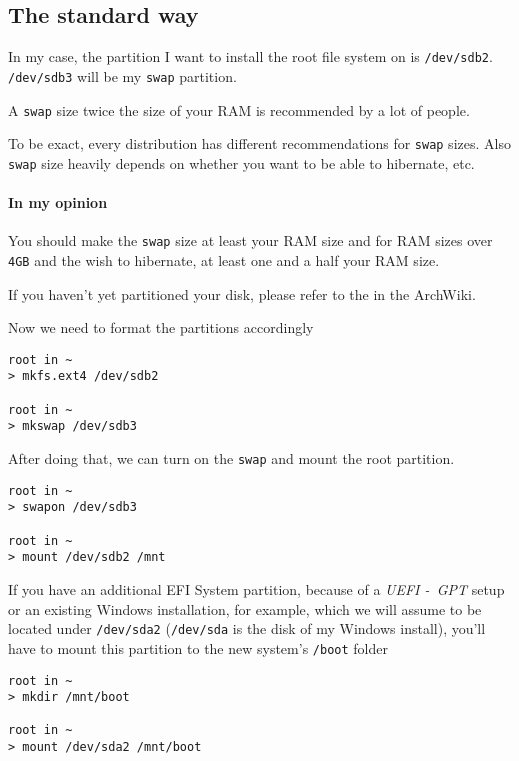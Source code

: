 \documentclass[10pt]{dustdoc}
\begin{document}
\subsection{The standard way}%
\label{sec:the-standard-way}

In my case, the partition I want to install the root file system on is \texttt{/dev/sdb2}.
\texttt{/dev/sdb3} will be my \texttt{swap} partition.

\begin{NOTE}
    A \texttt{swap} size twice the size of your RAM is recommended by a lot of people.

    To be exact, every distribution has different recommendations for \texttt{swap} sizes.
    Also \texttt{swap} size heavily depends on whether you want to be able to hibernate, etc.

    \paragraph{In my opinion}
    You should make the \texttt{swap} size at least your RAM size and for RAM sizes over \texttt{4GB} and the wish to hibernate, at least one and a half your RAM size.
\end{NOTE}

\begin{IMPORTANT}
    If you haven’t yet partitioned your disk, please refer to the  in the ArchWiki.
\end{IMPORTANT}

Now we need to format the partitions accordingly

\begin{verbatim}
root in ~
> mkfs.ext4 /dev/sdb2

root in ~
> mkswap /dev/sdb3
\end{verbatim}

After doing that, we can turn on the \texttt{swap} and mount the root partition.

\begin{verbatim}
root in ~
> swapon /dev/sdb3

root in ~
> mount /dev/sdb2 /mnt
\end{verbatim}

\begin{NOTE}
    If you have an additional EFI System partition, because of a \emph{UEFI -\ GPT} setup or an existing Windows installation, for example, which we will assume to be located under \texttt{/dev/sda2} (\texttt{/dev/sda} is the disk of my Windows install), you’ll have to mount this partition to the new system's \texttt{/boot} folder

    \begin{verbatim}
root in ~
> mkdir /mnt/boot

root in ~
> mount /dev/sda2 /mnt/boot
    \end{verbatim}
\end{NOTE}
\end{document}
